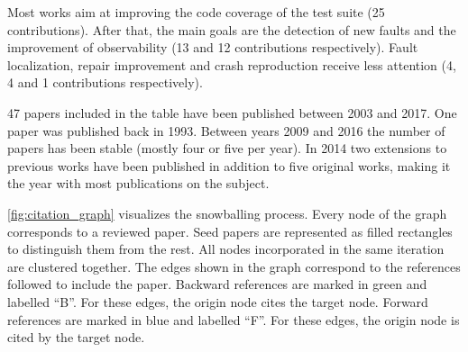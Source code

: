 Most works aim at improving the code coverage of the test suite (25 contributions). 
After that, the main goals are the detection of new faults and the improvement of observability  (13 and 12 contributions respectively). 
Fault localization, repair improvement and crash reproduction receive less attention (4, 4 and 1 contributions respectively).

47 papers included in the table have been published between 2003 and 2017. 
One paper was published back in 1993. 
Between years 2009 and 2016 the number of papers has been stable (mostly four or five per year). 
In 2014 two extensions to previous works have been published in addition to five original works, making it the year with most publications on the subject.

\autoref{fig:citation_graph} visualizes the snowballing process. 
Every node of the graph corresponds to a reviewed paper. 
Seed papers are represented as filled rectangles to distinguish them from the rest. 
All nodes incorporated in the same iteration are clustered together. 
The edges shown in the graph correspond to the references followed to include the paper. 
Backward references are marked in green and labelled ``B''. 
For these edges, the origin node cites the target node. 
Forward references are marked in blue and labelled ``F''. 
For these edges, the origin node is cited by the target node.

